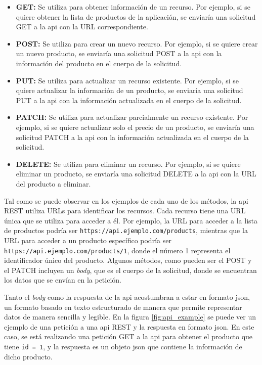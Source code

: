 \begin{itemize}
    \item \textbf{GET:} Se utiliza para obtener información de un recurso. Por ejemplo, si se quiere obtener la lista de productos de la aplicación, se enviaría una solicitud GET a la \gls{api} con la URL correspondiente.
    \item \textbf{POST:} Se utiliza para crear un nuevo recurso. Por ejemplo, si se quiere crear un nuevo producto, se enviaría una solicitud POST a la \gls{api} con la información del producto en el cuerpo de la solicitud.
    \item \textbf{PUT:} Se utiliza para actualizar un recurso existente. Por ejemplo, si se quiere actualizar la información de un producto, se enviaría una solicitud PUT a la \gls{api} con la información actualizada en el cuerpo de la solicitud.
    \item \textbf{PATCH:} Se utiliza para actualizar parcialmente un recurso existente. Por ejemplo, si se quiere actualizar solo el precio de un producto, se enviaría una solicitud PATCH a la \gls{api} con la información actualizada en el cuerpo de la solicitud.
    \item \textbf{DELETE:} Se utiliza para eliminar un recurso. Por ejemplo, si se quiere eliminar un producto, se enviaría una solicitud DELETE a la \gls{api} con la URL del producto a eliminar.
\end{itemize}

Tal como se puede observar en los ejemplos de cada uno de los métodos, la \gls{api} REST utiliza URLs para identificar los recursos. Cada recurso tiene una URL única que se utiliza para acceder a él. Por ejemplo, la URL para acceder a la lista de productos podría ser \texttt{https://api.ejemplo.com/products}, mientras que la URL para acceder a un producto específico podría ser \texttt{https://api.ejemplo.com/products/1}, donde el número 1 representa el identificador único del producto. Algunos métodos, como pueden ser el POST y el PATCH incluyen un \textit{body}, que es el cuerpo de la solicitud, donde se encuentran los datos que se envían en la petición.

Tanto el \textit{body} como la respuesta de la \gls{api} acostumbran a estar en formato \gls{json}, un formato basado en texto estructurado de manera que permite representar datos de manera sencilla y legible. En la figura \ref{fig:api_example} se puede ver un ejemplo de una petición a una \gls{api} REST y la respuesta en formato \gls{json}. En este caso, se está realizando una petición GET a la \gls{api} para obtener el producto que tiene \texttt{id = 1}, y la respuesta es un objeto \gls{json} que contiene la información de dicho producto.


